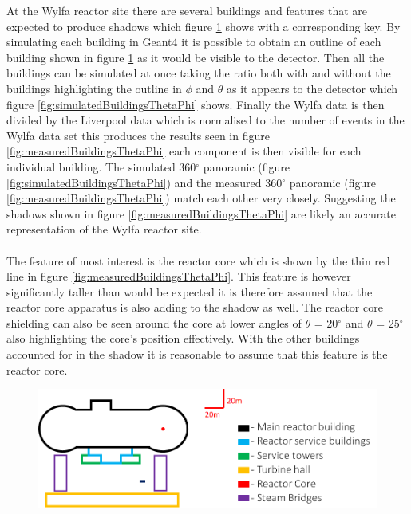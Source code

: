 \documentclass[12pt,a4paper]{article}
\begin{document}
At the Wylfa reactor site there are several buildings and features that are expected to produce shadows which figure \ref{fig:wylfaTraceOfBuildings} shows with a corresponding key. By simulating each building in Geant4 it is possible to obtain an outline of each building shown in figure \ref{fig:wylfaTraceOfBuildings} as it would be visible to the detector. Then all the buildings can be simulated at once taking the ratio both with and without the buildings highlighting the outline in $\phi$ and $\theta$ as it appears to the detector which figure \ref{fig:simulatedBuildingsThetaPhi} shows. Finally the Wylfa data is then divided by the Liverpool data which is normalised to the number of events in the Wylfa data set this produces the results seen in figure \ref{fig:measuredBuildingsThetaPhi} each component is then visible for each individual building. The simulated 360$^\circ$ panoramic (figure \ref{fig:simulatedBuildingsThetaPhi}) and the measured 360$^\circ$ panoramic (figure \ref{fig:measuredBuildingsThetaPhi}) match each other very closely. Suggesting the shadows shown in figure \ref{fig:measuredBuildingsThetaPhi} are likely an accurate representation of the Wylfa reactor site.
\\\\The feature of most interest is the reactor core which is shown by the thin red line in figure \ref{fig:measuredBuildingsThetaPhi}. This feature is however significantly taller than would be expected it is therefore assumed that the reactor core apparatus is also adding to the shadow as well. The reactor core shielding can also be seen around the core at lower angles of $\theta$ = 20$^\circ$ and $\theta$ = 25$^\circ$ also highlighting the core's position effectively. With the other buildings accounted for in the shadow it is reasonable to assume that this feature is the reactor core. 

\begin{figure}[H]
 \centering
 \includegraphics[width=1.0\linewidth]{wylfaReactorBuildings/wylfaTrace+key.png}
 \label{fig:wylfaTraceOfBuildings}
\end{figure}
\end{document}
